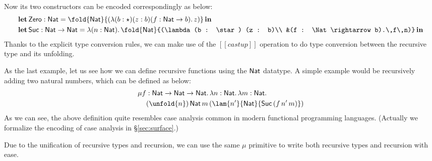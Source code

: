 Now its two constructors can be encoded correspondingly as below:
\begin{align*}
  \letbb\,&\zero : \Nat = \fold{\Nat}{(\lambda (b : \star) (z : b) (f : \Nat \rightarrow b).\,z)}\,\inb \\
  \letbb\,&\suc : \Nat \rightarrow \Nat = \lambda (n : \Nat).\,\fold{\Nat}{(\lambda (b : \star) (z : b)\\ &(f : \Nat \rightarrow b).\,f\,n)}\,\inb
\end{align*}
Thanks to the explicit type conversion rules, we can make use of the $[[castup]]$ operation to do type conversion between the recursive type and its unfolding.

As the last example, let us see how we can define recursive functions using the $\mathsf{Nat}$ datatype. A simple example would be recursively adding two natural numbers, which can be defined as below:
\begin{align*}
  \mu f &: \Nat \rightarrow \Nat \rightarrow \Nat.\,\lambda n : \Nat.\,\lambda m : \Nat.\\
  &(\unfold{n})\,\Nat\,m\,(\lam{n'}{\Nat}{\suc\,(f\,n'\,m)})
\end{align*}
As we can see, the above definition quite resembles case analysis common in modern functional programming languages. (Actually we formalize the encoding of case analysis in \S\ref{sec:surface}.)

Due to the unification of recursive types and recursion, we can use the same $\mu$ primitive to write both recursive types and recursion with ease.

